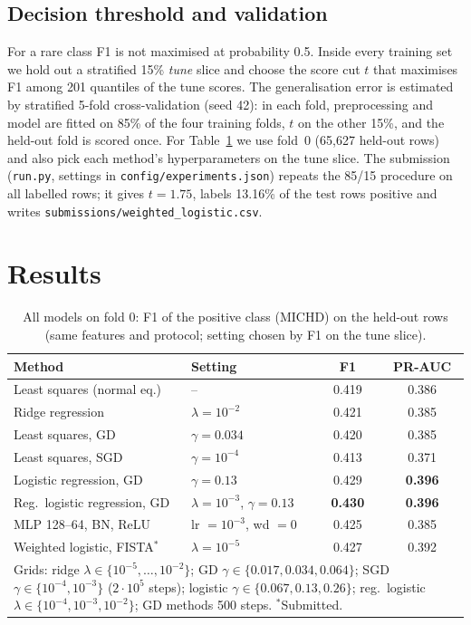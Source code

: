 \documentclass[10pt,conference,compsocconf]{IEEEtran}
\begin{document}
\subsection{Decision threshold and validation}
For a rare class F1 is not maximised at probability 0.5. Inside every training
set we hold out a stratified 15\% \emph{tune} slice and choose the score cut $t$
that maximises F1 among 201 quantiles of the tune scores.
The generalisation error is estimated by stratified 5-fold cross-validation
(seed 42): in each fold, preprocessing and model are fitted on 85\% of the four
training folds, $t$ on the other 15\%, and the held-out fold is scored once.
For Table~\ref{tab:methods} we use fold~0 (65{,}627 held-out rows) and also pick
each method's hyperparameters on the tune slice.
The submission (\texttt{run.py}, settings in
\texttt{config/experiments.json}) repeats the 85/15 procedure on all labelled
rows; it gives $t=1.75$, labels 13.16\% of the test rows positive and writes
\texttt{submissions/weighted\_logistic.csv}.

\section{Results}
\begin{table}[t]
\centering
\caption{All models on fold 0: F1 of the positive class (MICHD) on the
held-out rows (same features and protocol; setting chosen by F1 on the tune
slice).}
\label{tab:methods}
\footnotesize
\setlength{\tabcolsep}{4pt}
\begin{tabular}{llcc}
\toprule
Method & Setting & F1 & PR-AUC \\
\midrule
Least squares (normal eq.) & -- & 0.419 & 0.386 \\
Ridge regression & $\lambda=10^{-2}$ & 0.421 & 0.385 \\
Least squares, GD & $\gamma=0.034$ & 0.420 & 0.385 \\
Least squares, SGD & $\gamma=10^{-4}$ & 0.413 & 0.371 \\
Logistic regression, GD & $\gamma=0.13$ & 0.429 & \textbf{0.396} \\
Reg.\ logistic regression, GD & $\lambda=10^{-3}$, $\gamma=0.13$ & \textbf{0.430} & \textbf{0.396} \\
\midrule
MLP 128--64, BN, ReLU & lr $=10^{-3}$, wd $=0$ & 0.425 & 0.385 \\
Weighted logistic, FISTA$^{\ast}$ & $\lambda=10^{-5}$ & 0.427 & 0.392 \\
\bottomrule
\multicolumn{4}{p{0.95\columnwidth}}{\raggedright\scriptsize Grids: ridge
$\lambda\in\{10^{-5},\dots,10^{-2}\}$; GD $\gamma\in\{0.017,0.034,0.064\}$;
SGD $\gamma\in\{10^{-4},10^{-3}\}$ ($2\cdot10^{5}$ steps); logistic
$\gamma\in\{0.067,0.13,0.26\}$; reg.\ logistic
$\lambda\in\{10^{-4},10^{-3},10^{-2}\}$; GD methods 500 steps.
$^{\ast}$Submitted.} \\
\end{tabular}
\end{table}
\end{document}
